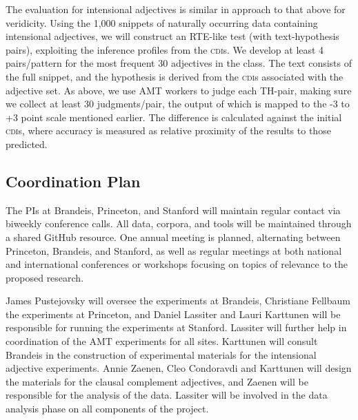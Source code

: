 \documentclass[10pt]{article}
\begin{document}
The evaluation for intensional adjectives is similar in approach to that above for  veridicity. 
Using the 1,000 snippets of naturally occurring data containing intensional adjectives, we will construct an RTE-like test (with {\sc text}-{\sc hypothesis} pairs), exploiting the inference profiles from the \textsc{cdi}s. We develop at least 4 pairs/pattern for the most frequent 30 adjectives in the class. 
The  {\sc text} consists of the full snippet, and the {\sc hypothesis} is derived from the \textsc{cdi}s associated with the adjective set. 
As above, we use AMT workers to judge each TH-pair, making sure we
collect at least 30 judgments/pair, the output of which is mapped to
the -3 to +3 point scale mentioned earlier. The difference is
calculated against the initial \textsc{cdi}s, where accuracy is measured
as relative proximity of the results  to those predicted. 
%


\vspace {-2mm}
\vspace {-2mm}
\subsection{Coordination Plan}
\vspace {-2mm}

The PIs at Brandeis, Princeton, and Stanford will maintain regular contact via biweekly  conference calls. 
All data, corpora, and tools will be maintained through a shared GitHub resource. 
One annual meeting is planned, alternating between Princeton, Brandeis, and Stanford, as well as regular meetings at both national and international conferences or workshops focusing on topics of relevance to the proposed research. 

James Pustejovsky will oversee the experiments at Brandeis, Christiane Fellbaum the experiments at Princeton, and Daniel Lassiter and Lauri Karttunen will be responsible for running the experiments at Stanford.  Lassiter will further help in coordination of the AMT experiments for all sites.  Karttunen will consult Brandeis in the construction of experimental materials for the intensional adjective experiments.  Annie Zaenen, Cleo Condoravdi and  Karttunen will design the materials for the clausal complement adjectives, and Zaenen will be responsible for the analysis of the data.  Lassiter will be involved in the data analysis phase on all components of the project. 
\end{document}

